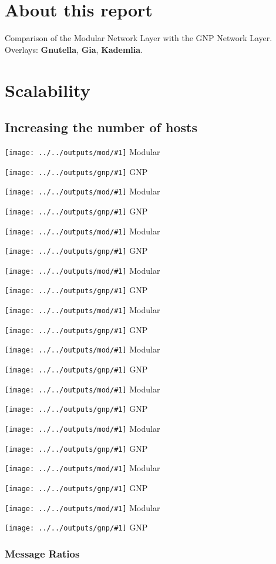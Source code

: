 \documentclass[longdoc,nosectionpage,colorbacktitle,accentcolor=tud1b,11pt,paper=a4]{tudreport}
\title{\komTitle}
\subtitle{\komNames}
\newcommand{\imga}[2]{
  \texttt{[image: ../../outputs/mod/\#1]} Modular

  \texttt{[image: ../../outputs/gnp/\#1]} GNP

}
\begin{document}
	\maketitle
	\frenchspacing

	\tableofcontents

	\clearpage

	\section{About this report}
  
	  Comparison of the Modular Network Layer with the GNP Network Layer.
	  Overlays: 
	  \textbf{Gnutella},
	  \textbf{Gia},
	  \textbf{Kademlia}.

        \newpage

	\section{Scalability}

	  \subsection{Increasing the number of hosts}

	  \imga{scal_avgDownBWConsWithHosts}{.85}

	  \imga{scal_avgNHopsWithHosts}{.85}

	  \imga{scal_avgUpBWConsWithHosts}{.85}

	  \imga{scal_bwWithHosts}{.85}

	  \imga{scal_qrtWithHosts}{.85}

	  \imga{scal_qSuccessWithHosts}{.85}

	  \imga{scal_staleContactsWithHosts}{.85}

	  \imga{scal_staleContactsZoomWithHosts}{.85}

	  \imga{scal_staleMsgsWithHosts}{.85}

	  \imga{scal_staleMsgsZoomWithHosts}{.85}

	  \subsubsection{Message Ratios}
\end{document}
